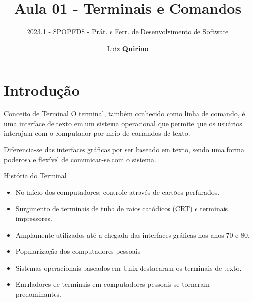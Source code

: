 \documentclass{beamer}
\title{Aula 01 - Terminais e Comandos}
\subtitle{2023.1 - SPOPFDS - Prát. e Ferr. de Desenvolvimento de Software}
\author{\href{mailto:luiz.quirino@ifsp.edu.br}{Luiz \textbf{Quirino}}}
\newcommand{\hrefcol}[2]{\textcolor{cyan}{\href{#1}{#2}}}
\begin{document}
\maketitle

%
%



\section{Introdução}
\begin{frame}{Conceito de Terminal}\justifying
	O terminal, também conhecido como linha de comando, é uma interface de texto em um sistema operacional que permite que os usuários interajam com o computador por meio de comandos de texto.

	\vspace{0.5cm}

	Diferencia-se das interfaces gráficas por ser baseado em texto, sendo uma forma poderosa e flexível de comunicar-se com o sistema.
\end{frame}
\begin{frame}{História do Terminal}\justifying
	\begin{itemize}
		\item No início dos computadores: controle através de cartões perfurados.
		\item Surgimento de terminais de tubo de raios catódicos (CRT) e terminais impressores.
		\item Amplamente utilizados até a chegada das interfaces gráficas nos anos 70 e 80.
		\item Popularização dos computadores pessoais.
		\item Sistemas operacionais baseados em Unix destacaram os terminais de texto.
		\item Emuladores de terminais em computadores pessoais se tornaram predominantes.
	\end{itemize}
\end{frame}
\end{document}
